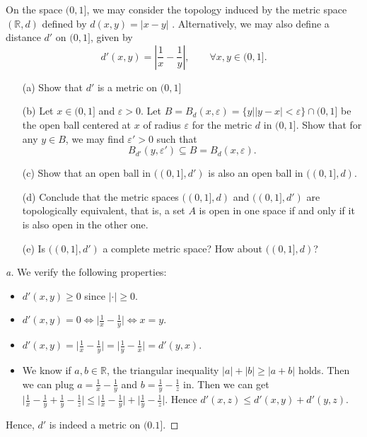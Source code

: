\begin{problem}
    On the space $(0,1]$, we may consider the topology induced by the metric space $(\mathbb{R},d)$ defined by
$d(x,y)=|x-y|$ . Alternatively, we may also define a distance $d'$ on $(0,1]$, given by
\[
d'(x,y) = \left| \frac{1}{x} - \frac{1}{y} \right|, \qquad \forall x,y \in (0,1].
\]

\begin{enumerate}
 \item[(a)] Show that $d'$ is a metric on $(0,1]$
 \item[(b)] Let $x \in (0,1]$ and $\varepsilon>0$. Let $B = B_{d}(x,\varepsilon)=\{y | |y-x| < \varepsilon \} \cap (0,1]$  be the open ball centered at $x$ of radius $\varepsilon$ for the metric $d$ in $(0,1]$.  
  Show that for any $y \in B$, we may find $\varepsilon'>0$ such that
  \[
  B_{d'}(y,\varepsilon') \subseteq B = B_{d}(x,\varepsilon).
  \]

 \item[(c)]Show that an open ball in $((0,1],d')$ is also an open ball in $((0,1],d)$.

 \item[(d)] Conclude that the metric spaces $((0,1],d)$ and $((0,1],d')$ are topologically equivalent, that is, a set $A$ is open in one space if and only if it is also open in the other one.

 \item[(e)] Is $((0,1],d')$ a complete metric space? How about $((0,1],d)$?
\end{enumerate}
\end{problem}

\begin{proof}[a]
    We verify the following properties:
    \begin{itemize}
        \item $d'(x,y) \geq 0$ since $\lvert \cdot \rvert \geq 0$.
        \item $d'(x,y) = 0 \iff \lvert\frac{1}{x} - \frac{1}{y}\rvert \iff x=y$.
        \item $d'(x,y) = \lvert\frac{1}{x} - \frac{1}{y}\rvert = \lvert\frac{1}{y} - \frac{1}{x}\rvert = d'(y,x)$.
        \item We know if $a, b \in \mathbb{R}$, the triangular inequality $\lvert a \rvert + \lvert b \rvert \geq \lvert a+b \rvert$ holds.
        Then we can plug $a = \frac{1}{x} - \frac{1}{y}$ and $b = \frac{1}{y} - \frac{1}{z}$ in. Then we can get $\lvert \frac{1}{x} - \frac{1}{y} + \frac{1}{y} - \frac{1}{z} \rvert \leq \lvert \frac{1}{x} - \frac{1}{y} \rvert + \lvert \frac{1}{y} - \frac{1}{z} \rvert$. Hence $d'(x,z) \leq d'(x,y) + d'(y,z)$.
    \end{itemize}
    Hence, $d'$ is indeed a metric on $(0.1]$.
\end{proof}

